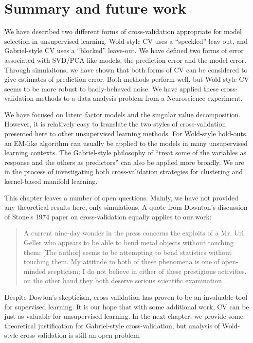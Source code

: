 \section{Summary and future work}

We have described two different forms of cross-validation appropriate for
model selection in unsupervised learning. Wold-style CV uses a ``speckled''
leav-out, and Gabriel-style CV uses a ``blocked'' leave-out. We have defined
two forms of error associated with SVD/PCA-like models, the prediction error
and the model error. Through simulaitons, we have shown that both forms of CV
can be considered to give estimates of prediction error. Both methods perform
well, but Wold-style CV seems to be more robust to badly-behaved noise. We
have applied these cross-validation methods to a data analysis problem from a
Neuroscience experiment.

We have focused on latent factor models and the singular value decomposition.
However, it is relatively easy to translate the two styles of cross-validation
presented here to other unsupervised learning methods. For Wold-style
hold-outs, an EM-like algorithm can usually be applied to the models in many
unsupervised learning contexts. The Gabriel-style philosophy of ``treat some
of the variables as response and the others as predictors'' can also be
applied more broadly. We are in the process of investigating both
cross-validation strategies for clustering and kernel-based manifold learning.

This chapter leaves a number of open questions.  Mainly, we have not provided 
any theoretical results here, only simulations.  A quote from Downton's 
discussion of Stone's 1974 paper on cross-validation equally applies to our 
work:
\begin{quote}
    A current nine-day wonder in the press concerns the exploits of a Mr. Uri
    Geller who appears to be able to bend metal objects without touching them;
    [The author] seems to be attempting to bend statistics without touching
    them. My attitude to both of these phenomena is one of open-minded 
    scepticism; I do not believe in either of these prestigious activities, on 
    the other hand they both deserve serious scientific examination
    \cite{stone1974cv}.
\end{quote}
Despite Dowton's skepticism, cross-validation has proven to be an invaluable tool for supervised learning.  It is our hope that with some additional work, CV can be just as valuable for unsupervised learning.  In the next chapter, we provide some theoretical justification for Gabriel-style cross-validation, but analysis of Wold-style cross-validation is still an open problem.


